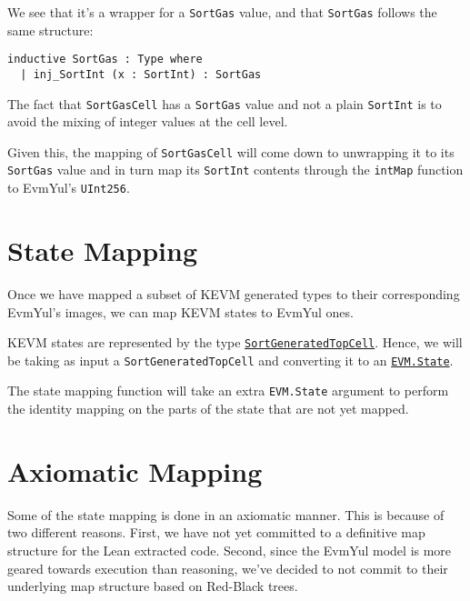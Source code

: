 We see that it's a wrapper for a \texttt{SortGas} value, and that
\texttt{SortGas} follows the same structure:

\begin{verbatim}
inductive SortGas : Type where
  | inj_SortInt (x : SortInt) : SortGas
\end{verbatim}

The fact that \texttt{SortGasCell} has a \texttt{SortGas} value and not a plain
\texttt{SortInt} is to avoid the mixing of integer values at the cell level.

Given this, the mapping of \texttt{SortGasCell} will come down to unwrapping it
to its \texttt{SortGas} value and in turn map its \texttt{SortInt} contents
through the \texttt{intMap} function to EvmYul's \texttt{UInt256}.

\section{State Mapping}

Once we have mapped a subset of KEVM generated types to their corresponding
EvmYul's images, we can map KEVM states to EvmYul ones.

\begin{definition}[stateMap]
\leanok\label{def:stateMap}

KEVM states are represented by the type
\href{https://runtimeverification.github.io/evm-equivalence/docs/EvmEquivalence/KEVM2Lean/Sorts.html#SortGeneratedTopCell}{\texttt{SortGeneratedTopCell}}.
Hence, we will be taking as input a \texttt{SortGeneratedTopCell} and converting
it to an
\href{https://runtimeverification.github.io/evm-equivalence/docs/EvmYul/EVM/State.html#EvmYul.EVM.State}{\texttt{EVM.State}}.

The state mapping function will take an extra \texttt{EVM.State} argument to
perform the identity mapping on the parts of the state that are not yet mapped.
\end{definition}

\section{Axiomatic Mapping}

Some of the state mapping is done in an axiomatic manner. This is because of two
different reasons. First, we have not yet committed to a definitive map structure
for the Lean extracted code. Second, since the EvmYul model is more geared
towards execution than reasoning, we've decided to not commit to their
underlying map structure based on Red-Black trees.

